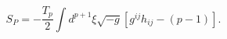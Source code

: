 \begin{equation}
S_{P}=-\frac{T_p}{2}\int d^{p+1}{\xi}\sqrt{-g}\left[g^{ij}h_{ij}-(p-1)\right].
\label{npol}
\end{equation}

